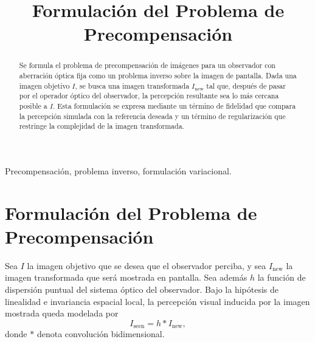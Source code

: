 \documentclass[conference]{IEEEtran}
\title{Formulación del Problema de Precompensación}
\author{
\IEEEauthorblockN{Documento metodológico}
\IEEEauthorblockA{Versión reducida}
}
\begin{document}
\maketitle

\begin{abstract}
Se formula el problema de precompensación de imágenes para un observador con aberración óptica fija como un problema inverso sobre la imagen de pantalla. Dada una imagen objetivo $I$, se busca una imagen transformada $I_{\text{new}}$ tal que, después de pasar por el operador óptico del observador, la percepción resultante sea lo más cercana posible a $I$. Esta formulación se expresa mediante un término de fidelidad que compara la percepción simulada con la referencia deseada y un término de regularización que restringe la complejidad de la imagen transformada.
\end{abstract}

\begin{IEEEkeywords}
Precompensación, problema inverso, formulación variacional.
\end{IEEEkeywords}

\section{Formulación del Problema de Precompensación}
Sea $I$ la imagen objetivo que se desea que el observador perciba, y sea $I_{\text{new}}$ la imagen transformada que será mostrada en pantalla. Sea además $h$ la función de dispersión puntual del sistema óptico del observador. Bajo la hipótesis de linealidad e invariancia espacial local, la percepción visual inducida por la imagen mostrada queda modelada por
\begin{equation}
I_{\text{seen}} = h * I_{\text{new}},
\label{eq:forward}
\end{equation}
donde $*$ denota convolución bidimensional.
\end{document}
